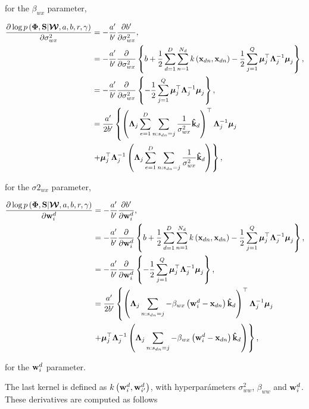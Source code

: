 	for the $\beta_{wx}$ parameter,
	
	\begin{align}
	\frac{\partial \log p\left(\boldsymbol{\Phi},\mathbf{S}|\boldsymbol{\mathcal{W}},a,b,r,\gamma\right)}{\partial \sigma^2_{wx}} &= -\frac{a'}{b'}\frac{\partial b'}{\partial \sigma^2_{wx}}, \\
	& =  -\frac{a'}{b'}\frac{\partial }{\partial \sigma^2_{wx}}\left\{b+{\frac{1}{2}}\sum\limits_{d=1}^{D}\sum\limits_{n=1}^{N_d}k\left(\mathbf{x}_{dn},\mathbf{x}_{dn}\right)-{\frac{1}{2}}\sum\limits_{j=1}^{Q}\boldsymbol{\mu}_j^\top \boldsymbol{\Lambda}_j^{-1}\boldsymbol{\mu}_j\right\}, \\
	& =  -\frac{a'}{b'}\frac{\partial }{\partial \sigma^2_{wx}}\left\{-{\frac{1}{2}}\sum\limits_{j=1}^{Q}\boldsymbol{\mu}_j^\top \boldsymbol{\Lambda}_j^{-1}\boldsymbol{\mu}_j\right\}, \\
	& =  \frac{a'}{2b'} \left\{\left(\boldsymbol{\Lambda}_j\sum\limits_{e=1}^{D}{\sum\limits_{n:s_{dn}=j}\frac{1}{\sigma^2_{wx}}\mathbf{\hat{k}}_d}\right)^\top\boldsymbol{\Lambda}_j^{-1}\boldsymbol{\mu}_j \right. \\
	&\left. +   \boldsymbol{\mu}_j^\top\boldsymbol{\Lambda}_j^{-1}\left(\boldsymbol{\Lambda}_j\sum\limits_{e=1}^{D}{\sum\limits_{n:s_{dn}=j}\frac{1}{\sigma^2_{wx}}\mathbf{\hat{k}}_d}\right)
	\right\},
	\end{align}
	
	for the $\sigma2_{wx}$ parameter,
	
	\begin{align}
	\frac{\partial \log p\left(\boldsymbol{\Phi},\mathbf{S}|\boldsymbol{\mathcal{W}},a,b,r,\gamma\right)}{\partial \mathbf{w}_{i}^d} &= -\frac{a'}{b'}\frac{\partial b'}{\partial \mathbf{w}_{i}^d}, \\
	& =  -\frac{a'}{b'}\frac{\partial }{\partial \mathbf{w}_{i}^d}\left\{b+{\frac{1}{2}}\sum\limits_{d=1}^{D}\sum\limits_{n=1}^{N_d}k\left(\mathbf{x}_{dn},\mathbf{x}_{dn}\right)-{\frac{1}{2}}\sum\limits_{j=1}^{Q}\boldsymbol{\mu}_j^\top \boldsymbol{\Lambda}_j^{-1}\boldsymbol{\mu}_j\right\}, \\
	& =  -\frac{a'}{b'}\frac{\partial }{\partial \mathbf{w}_{i}^d}\left\{-{\frac{1}{2}}\sum\limits_{j=1}^{Q}\boldsymbol{\mu}_j^\top \boldsymbol{\Lambda}_j^{-1}\boldsymbol{\mu}_j\right\}, \\
	& =  \frac{a'}{2b'} \left\{\left(\boldsymbol{\Lambda}_j\sum\limits_{n:s_{dn}=j}{-\beta_{wx}\left(\mathbf{w}_{i}^d-\mathbf{x}_{dn}\right)\mathbf{\hat{k}}_d}\right)^\top\boldsymbol{\Lambda}_j^{-1}\boldsymbol{\mu}_j \right. \\
	&\left. +   \boldsymbol{\mu}_j^\top\boldsymbol{\Lambda}_j^{-1}\left(\boldsymbol{\Lambda}_j\sum\limits_{n:s_{dn}=j}{-\beta_{wx}\left(\mathbf{w}_{i}^d-\mathbf{x}_{dn}\right)\mathbf{\hat{k}}_d}\right)
	\right\},
	\end{align}
	
	for the $\mathbf{w}_{i}^d$ parameter.
	
	The last kernel is defined as $k\left(\mathbf{w}_{i}^d,\mathbf{w}_{i'}^d\right)$, with hyperparámeters $\sigma^2_{ww}$, $\beta_{ww}$ and $\mathbf{w}_{i}^d$. These derivatives are computed as follows
	
